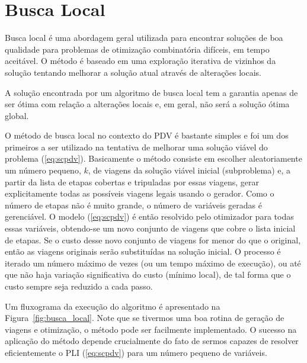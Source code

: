 \section{Busca Local}
\label{sec:metodos_busca}

Busca local é uma abordagem geral utilizada para encontrar soluções de boa qualidade para problemas
de otimização combinatória difíceis, em tempo aceitável. O método é baseado em uma exploração 
iterativa de vizinhos da solução tentando melhorar a solução atual através de alterações locais.

A solução encontrada por um algoritmo de busca local tem a garantia apenas de ser ótima com relação
a alterações locais e, em geral, não será a solução ótima global.

O método de busca local no contexto do PDV é bastante simples e foi um dos primeiros a ser utilizado
na tentativa de melhorar uma solução viável do problema (\ref{eq:scpdv}). Basicamente o método
consiste em escolher aleatoriamente um número pequeno, $k$, de viagens da solução viável inicial
(subproblema) e, a partir da lista de etapas cobertas e tripuladas por essas viagens, gerar
explicitamente todas as possíveis viagens legais usando o gerador. Como o número de etapas não é
muito grande, o número de variáveis geradas é gerenciável. O modelo (\ref{eq:scpdv}) é então
resolvido pelo otimizador para todas essas variáveis, obtendo-se um novo conjunto de viagens que
cobre o lista inicial de etapas. Se o custo desse novo conjunto de viagens for menor do que o
original, então as viagens originais serão substituídas na solução inicial. O processo é iterado um
número máximo de vezes (ou um tempo máximo de execução), ou até que não haja variação significativa
do custo (mínimo local), de tal forma que o custo sempre seja reduzido a cada passo.

Um fluxograma da execução do algoritmo é apresentado na Figura~\ref{fig:busca_local}. Note que se
tivermos uma boa rotina de geração de viagens e otimização, o método pode ser facilmente 
implementado. O sucesso na aplicação do método depende crucialmente do fato de sermos capazes de 
resolver eficientemente o PLI (\ref{eq:scpdv}) para um número pequeno de variáveis.

